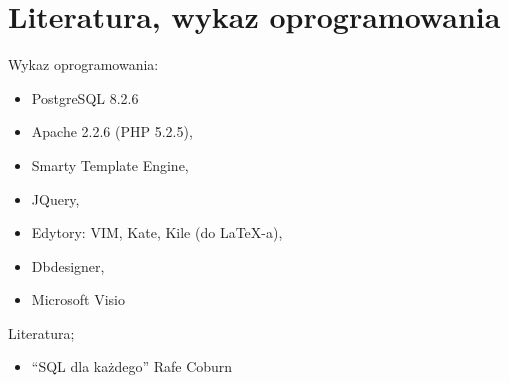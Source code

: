 \section{Literatura, wykaz oprogramowania}
Wykaz oprogramowania:
\begin{itemize}
    \item PostgreSQL 8.2.6
    \item Apache 2.2.6  (PHP 5.2.5),
    \item Smarty Template Engine,
    \item JQuery,
    \item Edytory: VIM, Kate, Kile (do LaTeX-a),
    \item Dbdesigner,
    \item Microsoft Visio
\end{itemize}

Literatura;
\begin{itemize}
    \item ``SQL dla każdego'' Rafe Coburn
\end{itemize}

